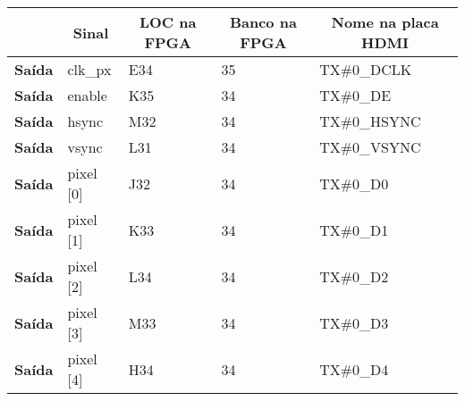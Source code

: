 \begin{longtable}{@{}rllll@{}}
			
			\hline
			\centering
			\textbf{}                           & \multicolumn{1}{c}{\textbf{Sinal}} & \multicolumn{1}{c}{\textbf{LOC na FPGA}} & \multicolumn{1}{c}{\textbf{Banco na FPGA}} & \multicolumn{1}{c}{\textbf{Nome na placa HDMI}} \\  \hline \endhead
			\multicolumn{1}{r|}{\textbf{Saída}} & clk\_px                            & E34                                      & 35                                         & TX\#0\_DCLK                                     \\
			\multicolumn{1}{r|}{\textbf{Saída}} & enable                             & K35                                      & 34                                         & TX\#0\_DE                                       \\
			\multicolumn{1}{r|}{\textbf{Saída}} & hsync                              & M32                                      & 34                                         & TX\#0\_HSYNC                                    \\
			\multicolumn{1}{r|}{\textbf{Saída}} & vsync                              & L31                                      & 34                                         & TX\#0\_VSYNC                                    \\
			\multicolumn{1}{r|}{\textbf{Saída}} & pixel {[}0{]}                      & J32                                      & 34                                         & TX\#0\_D0                                       \\
			\multicolumn{1}{r|}{\textbf{Saída}} & pixel {[}1{]}                      & K33                                      & 34                                         & TX\#0\_D1                                       \\
			\multicolumn{1}{r|}{\textbf{Saída}} & pixel {[}2{]}                      & L34                                      & 34                                         & TX\#0\_D2                                       \\
			\multicolumn{1}{r|}{\textbf{Saída}} & pixel {[}3{]}                      & M33                                      & 34                                         & TX\#0\_D3                                       \\
			\multicolumn{1}{r|}{\textbf{Saída}} & pixel {[}4{]}                      & H34                                      & 34                                         & TX\#0\_D4                                       \\

\end{longtable}
